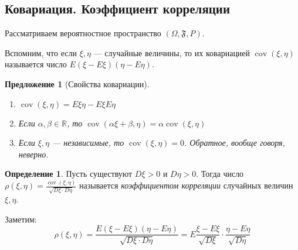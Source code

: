 \documentclass[11pt,openany,a4paper]{scrartcl}
\theoremstyle{plain}
\newtheorem{proposition}[theorem]{Предложение}
\theoremstyle{definition}
\newtheorem{definition}[theorem]{Определение}
\newcommand\mb{\mathbb}
\newcommand\real{\mb R}
\DeclareMathOperator{\cov}{cov}
\begin{document}
\subsection{Ковариация. Коэффициент корреляции}

Рассматриваем вероятностное пространство $(\Omega, \mathfrak F, P)$.

Вспомним, что если $\xi, \eta$ — случайные величины, то их ковариацией $\cov (\xi, \eta)$
называется число $E(\xi - E\xi)(\eta - E\eta)$.
\begin{proposition}[Свойства ковариации]
\mbox{}
    \begin{enumerate}
        \item $\cov(\xi, \eta) = E\xi\eta - E\xi E\eta$
        \item Если $\alpha, \beta \in \real$, то $\cov(\alpha\xi + \beta, \eta) =
        \alpha\cov(\xi, \eta)$
        \item Если $\xi, \eta$ — независимые, то $\cov(\xi, \eta) = 0$. Обратное,
        вообще говоря, неверно.
    \end{enumerate}
\end{proposition}
\begin{definition}
    Пусть существуют $D\xi > 0$ и $D\eta > 0$. Тогда число $\rho(\xi, \eta) =
    \frac{\cov(\xi, \eta)}{\sqrt{D\xi\cdot D\eta}}$ называется \emph{коэффициентом
    корреляции} случайных величин $\xi, \eta$.
\end{definition}

Заметим:
$$
\rho(\xi, \eta) =
\frac{E(\xi - E\xi)(\eta - E\eta)}{\sqrt{D\xi\cdot D\eta}} =
E\frac{\xi - E\xi}{\sqrt{D\xi}}\cdot \frac{\eta - E\eta}{\sqrt{D\eta}}
$$
\end{document}
